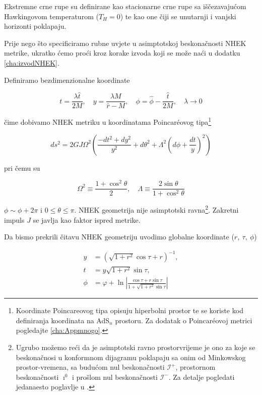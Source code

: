 Ekstremne crne rupe su definirane kao stacionarne crne rupe sa iščezavajućom Hawkingovom temperaturom ($T_H=0$) te kao one čiji se unutarnji i vanjski horizonti poklapaju.

Prije nego što specificiramo rubne uvjete u asimptotskoj beskonačnosti NHEK metrike, ukratko ćemo proći kroz korake izvoda koji se može naći u dodatku \ref{cha:izvodNHEK}.

\noindent Definiramo bezdimenzionalne koordinate

\begin{equation}
t=\frac{\lambda \hat{t}}{2M},\quad y=\frac{\lambda M}{\hat{r}-M},\quad \phi=\hat{\phi}-\frac{\hat{t}}{2M},\quad \lambda\to 0
\end{equation}

\noindent čime dobivamo NHEK metriku u koordinatama Poincar\'eovog tipa\footnote{Koordinate Poincareovog tipa opisuju hiperbolni prostor te se koriste kod definiranja koordinata na AdS${}_n$ prostoru. Za dodatak o Poincar\'eovoj metrici pogledajte \ref{cha:Appmnogo}.}

\begin{equation}
ds^2=2GJ\Omega^2\left(\frac{-dt^2+dy^2}{y^2}+d\theta^2+\Lambda^2\left(d\phi+\frac{dt}{y}\right)^2\right)
\end{equation}

\noindent pri čemu su 

\begin{equation}
\Omega^2\equiv\frac{1+\cos^2\theta}{2},\quad\Lambda\equiv\frac{2\sin\theta}{1+\cos^2\theta}
\end{equation}

\noindent $\phi\sim\phi+2\pi$ i $0\leq \theta\leq \pi$. NHEK geometrija nije asimptotski ravna\footnote{Ugrubo možemo reći da je asimptotski ravno prostorvrijeme je ono za koje se beskonačnosi u konformnom dijagramu poklapaju sa onim od Minkowskog prostor-vremena, sa budućom nul beskonačnosti $\mathscr{I}^+$, prostornom beskonačnosti $\imath^0$ i prošlom nul beskonačnosti $\mathscr{I}^-$. Za detalje pogledati jedanaesto poglavlje u \citep{wald2010general}.}. Zakretni impuls $J$ se javlja kao faktor ispred metrike.

Da bismo prekrili čitavu NHEK geometriju uvodimo globalne koordinate ($r,\ \tau,\ \phi$)

\begin{equation}
\begin{split}
y&=(\sqrt{1+r^2}\cos\tau+r)^{-1},\\
t&=y\sqrt{1+r^2}\sin\tau,\\
\phi&=\varphi+\ln\left\lvert\frac{\cos\tau+r\sin\tau}{1+\sqrt{1+r^2}\sin\tau}\right\rvert
\end{split}
\end{equation}

